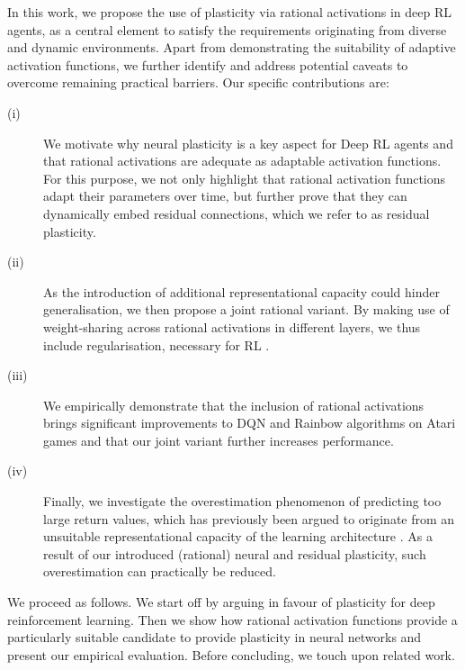 \documentclass[accepted]{article}
\theoremstyle{plain}
\theoremstyle{definition}
\theoremstyle{remark}
\begin{document}
In this work, we propose the use of plasticity via rational activations in deep RL agents, as a central element to satisfy the requirements originating from diverse and dynamic environments. Apart from demonstrating the suitability of adaptive activation functions, we further identify and address potential caveats to overcome remaining practical barriers. Our specific contributions are:
\begin{description}
\item[(i)] We motivate why neural plasticity is a key aspect for Deep RL agents and that rational activations are adequate as adaptable activation functions. For this purpose, we not only highlight that rational activation functions adapt their parameters over time, but further prove that they can dynamically embed residual connections, which we refer to as residual plasticity. 
\item[(ii)] As the introduction of additional representational capacity could hinder generalisation, we then propose a joint rational variant. By making use of weight-sharing across rational activations in different layers, we thus include regularisation, necessary for RL \citep{farebrother2018regdqn, RoyBHNP20regul, YaratsKF21Image}. 
\item[(iii)] We empirically demonstrate that the inclusion of rational activations brings significant improvements to DQN and Rainbow algorithms on Atari games and that our joint variant further increases performance. 
\item[(iv)] Finally, we investigate the overestimation phenomenon of predicting too large return values, which has previously been argued to originate from an unsuitable representational capacity of the learning architecture \citep{van2016deep}. As a result of our introduced (rational) neural and residual plasticity, such overestimation can practically be reduced.
\end{description}
We proceed as follows. We start off by arguing in favour of plasticity for deep reinforcement learning. Then we show how rational activation functions provide a particularly suitable candidate to provide plasticity in neural networks and present our empirical evaluation. Before concluding, we touch upon related work. 
\end{document}
